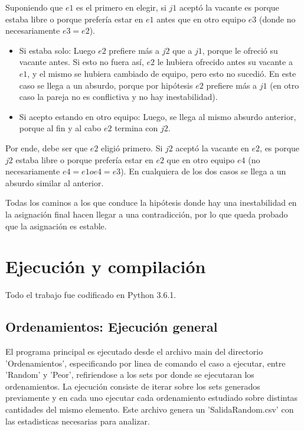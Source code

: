 \documentclass[article,a4paper]{article}
\begin{document}
Suponiendo que $e1$ es el primero en elegir, si $j1$ aceptó la vacante es porque estaba libre o porque prefería estar en $e1$ antes que en otro equipo $e3$ (donde no necesariamente $e3 = e2$).

\begin{itemize}
\item{Si estaba solo: } Luego $e2$ prefiere más a $j2$ que a $j1$, porque le ofreció su vacante antes. Si esto no fuera así, $e2$ le hubiera ofrecido antes su vacante a $e1$, y el mismo se hubiera cambiado de equipo, pero esto no sucedió. En este caso se llega a un absurdo, porque por hipótesis $e2$ prefiere más a $j1$ (en otro caso la pareja no es conflictiva y no hay inestabilidad).
\item{Si acepto estando en otro equipo: } Luego, se llega al mismo absurdo anterior, porque al fin y al cabo $e2$ termina con $j2$.
\end{itemize}

Por ende, debe ser que $e2$ eligió primero. Si $j2$ aceptó la vacante en $e2$, es porque $j2$ estaba libre o porque prefería estar en $e2$ que en otro equipo $e4$ (no necesariamente $e4 = e1 o e4 = e3$). En cualquiera de los dos casos se llega a un absurdo similar al anterior.

Todas los caminos a los que conduce la hipótesis donde hay una inestabilidad en la asignación final hacen llegar a una contradicción, por lo que queda probado que la asignación es estable.


\newpage
\appendix

\section{Ejecución y compilación}

Todo el trabajo fue codificado en Python 3.6.1.

\subsection{Ordenamientos: Ejecución general}

El programa principal es ejecutado desde el archivo main del directorio 'Ordenamientos', especificando por linea de comando el caso a ejecutar, entre 'Random' y 'Peor', refiriendose a los sets por donde se ejecutaran los ordenamientos. La ejecución consiste de iterar sobre los sets generados previamente y en cada uno ejecutar cada ordenamiento estudiado sobre distintas cantidades del mismo elemento. Este archivo genera un 'SalidaRandom.csv' con las estadisticas necesarias para analizar.
\end{document}
